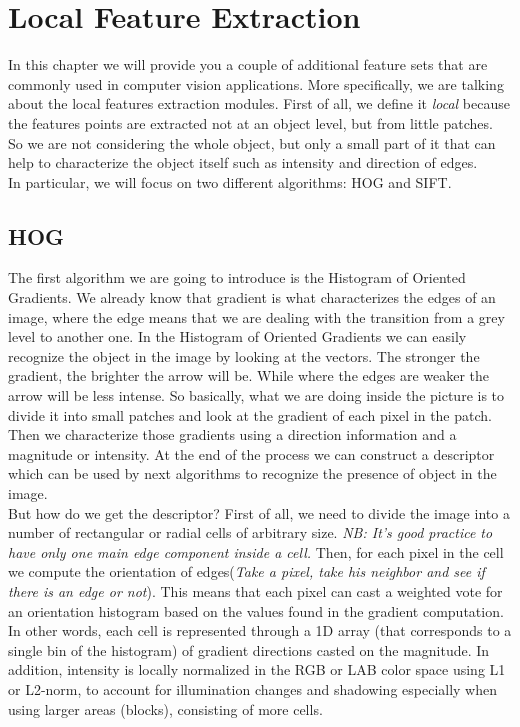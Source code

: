 \chapter{Local Feature Extraction}
In this chapter we will provide you a couple of additional feature sets that are commonly used in computer vision applications.
More specifically, we are talking about the local features extraction modules. 
First of all, we define it \textit{local} because the features points are extracted not at an object level, but from little patches. 
So we are not considering the whole object, but only a small part of it that can help to characterize the object itself such as intensity and direction of edges.
\\
In particular, we will focus on two different algorithms: HOG and SIFT.
\section{HOG}
The first algorithm we are going to introduce is the Histogram of Oriented Gradients.
We already know that gradient is what characterizes the edges of an image, where the edge means that we are dealing with the transition from a grey level to another one.
In the Histogram of Oriented Gradients we can easily recognize the object in the image by looking at the vectors. The stronger the gradient, the brighter the arrow will be.
While where the edges are weaker the arrow will be less intense.
So basically, what we are doing inside the picture is to divide it into small patches and look at the gradient of each pixel in the patch.
Then we characterize those gradients using a direction information and a magnitude or intensity.
At the end of the process we can construct a descriptor which can be used by next algorithms to recognize the presence of object in the image.
\\But how do we get the descriptor?
First of all, we need to divide the image into a number of rectangular or radial cells of arbitrary size.
\textit{NB: It's good practice to have only one main edge component inside a cell.} Then, for each pixel in the cell we compute the orientation of edges(\textit{Take a pixel, take his neighbor and see if there is an edge or not}).
This means that each pixel can cast a weighted vote for an orientation histogram based on the values found in the gradient computation.
In other words, each cell is represented through a 1D array (that corresponds to a single bin of the histogram) of gradient directions casted on the magnitude.
In addition, intensity is locally normalized in the RGB or LAB color space using L1 or L2-norm, to account for illumination changes and shadowing especially when using larger areas (blocks), consisting of more cells.
